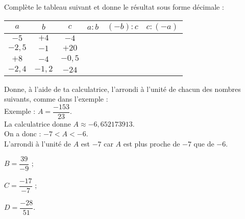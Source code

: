 \begin{exercice}
Complète le tableau suivant et donne le résultat sous forme décimale :
{\small
\begin{center}
\begin{tabular}{|c|c|c|c|c|c|}
\hline
\cellcolor{H2} $a$ & \cellcolor{H2} $b$ & \cellcolor{H2} $c$ & \cellcolor{A2} $a : b$ & \cellcolor{A2} $(-b) : c$ & \cellcolor{A2} $c : (-a)$ \\\hline 
\cellcolor{H3} $-5$ & \cellcolor{H3} $+4$ & \cellcolor{H3} $-4$ & \cellcolor{A3} & \cellcolor{A3} & \cellcolor{A3} \\\hline
\cellcolor{H3} $-2,5$ & \cellcolor{H3} $-1$ & \cellcolor{H3} $+20$ & \cellcolor{A3} & \cellcolor{A3} & \cellcolor{A3} \\\hline
\cellcolor{H3} $+8$ & \cellcolor{H3} $-4$ & \cellcolor{H3} $-0,5$ & \cellcolor{A3} & \cellcolor{A3} & \cellcolor{A3} \\\hline
\cellcolor{H3} $-2,4$ & \cellcolor{H3} $-1,2$ & \cellcolor{H3} $-24$ & \cellcolor{A3} & \cellcolor{A3} & \cellcolor{A3} \\\hline
 \end{tabular}
 \end{center}
 } %
\end{exercice}


\begin{exercice}
Donne, à l'aide de ta calculatrice, l'arrondi à l'unité de chacun des nombres suivants, comme dans l'exemple : \\[0.5em]
Exemple : $A = \dfrac{-153}{23}$. \\[0.5em]
La calculatrice donne $A \approx -6,652173913$. \\[0.5em]
On a donc : $-7 < A < -6$. \\[0.5em]
L'arrondi à l'unité de $A$ est $-7$ car $A$ est plus proche de $-7$ que de $-6$.
\begin{colitemize}{3}
 \item $B = \dfrac{39}{-9}$ ;
 \item $C = \dfrac{-17}{-7}$ ;
 \item $D = \dfrac{-28}{51}$.
 \end{colitemize}
\end{exercice}



